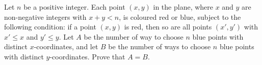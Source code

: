 Let $n$ be a positive integer. Each point $\left(x,y\right)$ in the plane, where $x$ and $y$ are non-negative integers with $x+y<n$, is coloured red or blue, subject to the following condition: if a point $\left(x,y\right)$ is red, then so are all points $\left(x',y'\right)$ with $x'\leq x$ and $y'\leq y$. Let $A$ be the number of way to choose $n$ blue points with distinct $x$-coordinates, and let $B$ be the number of ways to choose $n$ blue points with distinct $y$-coordinates. Prove that $A=B$.